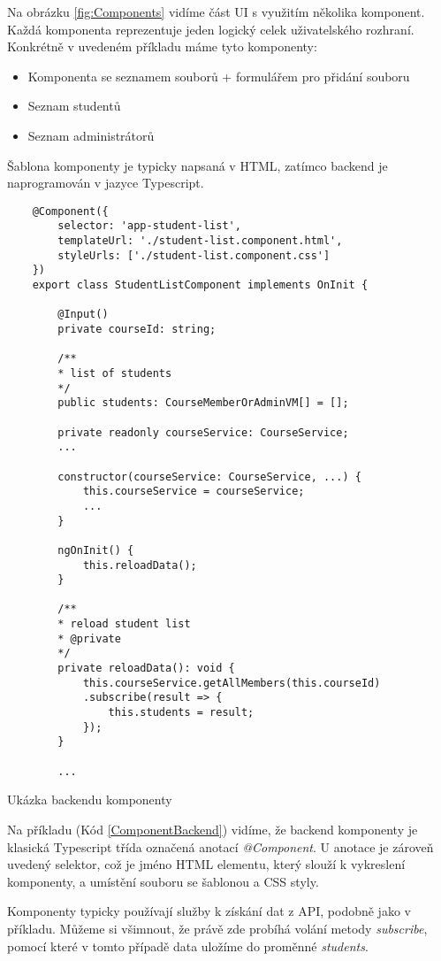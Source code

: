 Na obrázku \ref{fig:Components} vidíme část UI s využitím několika komponent. Každá komponenta reprezentuje jeden logický celek uživatelského rozhraní. Konkrétně v uvedeném příkladu máme tyto komponenty:

\begin{itemize}
	\item Komponenta se seznamem souborů + formulářem pro přidání souboru
	\item Seznam studentů
	\item Seznam administrátorů
\end{itemize}

Šablona komponenty je typicky napsaná v HTML, zatímco backend je naprogramován v jazyce Typescript. 

\lstset{style=typescript}

\begin{program}
	\begin{lstlisting}
	@Component({
		selector: 'app-student-list',
		templateUrl: './student-list.component.html',
		styleUrls: ['./student-list.component.css']
	})
	export class StudentListComponent implements OnInit {
	
		@Input()
		private courseId: string;
		
		/**
		* list of students
		*/
		public students: CourseMemberOrAdminVM[] = [];
		
		private readonly courseService: CourseService;
		...
		
		constructor(courseService: CourseService, ...) {
			this.courseService = courseService;
			...
		}
		
		ngOnInit() {
			this.reloadData();
		}
		
		/**
		* reload student list
		* @private
		*/
		private reloadData(): void {
			this.courseService.getAllMembers(this.courseId)
			.subscribe(result => {
				this.students = result;
			});
		}
		
		...
	\end{lstlisting}
	\caption{Ukázka backendu komponenty}
	\label{ComponentBackend}
\end{program}

Na příkladu (Kód \ref{ComponentBackend}) vidíme, že backend komponenty je klasická Typescript třída označená anotací \textit{@Component}. U anotace je zároveň uvedený selektor, což je jméno HTML elementu, který slouží k vykreslení komponenty, a umístění souboru se šablonou a CSS styly.

Komponenty typicky používají služby k získání dat z API, podobně jako v příkladu. Můžeme si všimnout, že právě zde probíhá volání metody \textit{subscribe}, pomocí které v tomto případě data uložíme do proměnné \textit{students}.

